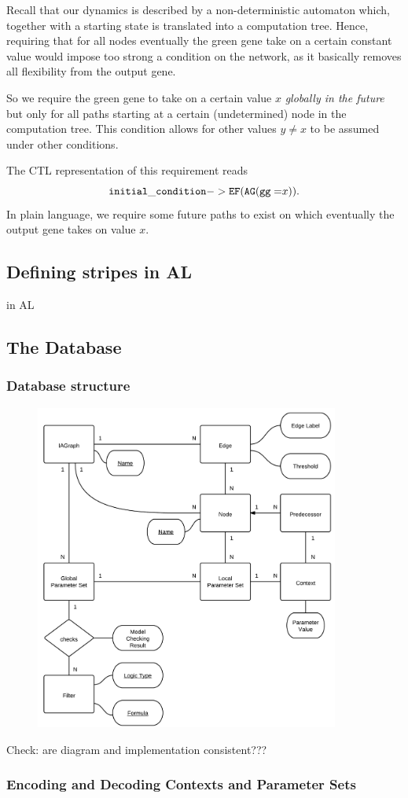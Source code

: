 \documentclass{article}
\begin{document}
\begin{flushleft}
Recall that our dynamics is described by a non-deterministic automaton which,
together with a starting state is translated into a computation tree. Hence,
requiring that for all nodes eventually the green gene take on a certain
constant value would impose too strong a condition on the network, as it
basically removes all flexibility from the output gene.

So we require the green gene to take on a certain value $x$
{\it globally in the future} but only for all paths starting at a certain
(undetermined) node in the computation tree. This condition allows for other
values $y\neq x$ to be assumed under other conditions.

The CTL representation of this requirement reads
\begin{equation}
{\tt initial\_condition  -> EF(AG(gg=}x{\tt ))}.
\end{equation}
In plain language, we require some future paths to exist on which
eventually the output gene takes on value $x$. 


\subsection{Defining stripes in AL}

in AL

\subsection{The Database}

\subsubsection{Database structure}

\begin{figure}[h!]
\centering 
\includegraphics[width=10cm]{ERDiagramRegNetTool.png}
\end{figure}

Check: are diagram and implementation consistent???

\subsubsection{Encoding and Decoding Contexts and Parameter Sets}

\end{flushleft}
\end{document}
